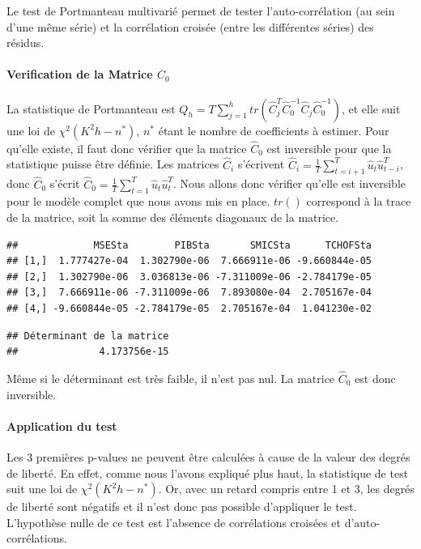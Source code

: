 \documentclass[11pt,]{article}
\let\oldparagraph\paragraph
\renewcommand{\paragraph}[1]{\oldparagraph{#1}\mbox{}}
\begin{document}
Le test de Portmanteau multivarié permet de tester l'auto-corrélation
(au sein d'une même série) et la corrélation croisée (entre les
différentes séries) des résidus.

\paragraph{\texorpdfstring{Verification de la Matrice
\(C_0\)}{Verification de la Matrice C\_0}}\label{verification-de-la-matrice-c_0}

La statistique de Portmanteau est
\(Q_h = T \sum_{j=1}^h tr(\hat{C}_j^T \hat{C}_0^{-1} \hat{C}_j \hat{C}_0^{-1})\),
et elle suit une loi de \(\chi^2(K^2h - n^*)\), \(n^*\) étant le nombre
de coefficients à estimer. Pour qu'elle existe, il faut donc vérifier
que la matrice \(\hat{C}_0\) est inversible pour que la statistique
puisse être définie. Les matrices \(\hat{C}_i\) s'écrivent
\(\hat{C}_i = \frac{1}{T} \sum_{t=i+1}^T \hat{u}_t \hat{u}_{t-i}^T\),
donc \(\hat{C}_0\) s'écrit
\(\hat{C}_0 = \frac{1}{T} \sum_{t=1}^T \hat{u}_t \hat{u}_t^T\). Nous
allons donc vérifier qu'elle est inversible pour le modèle complet que
nous avons mis en place. \(tr()\) correspond à la trace de la matrice,
soit la somme des éléments diagonaux de la matrice.

\begin{verbatim}
##             MSESta        PIBSta       SMICSta      TCHOFSta
## [1,]  1.777427e-04  1.302790e-06  7.666911e-06 -9.660844e-05
## [2,]  1.302790e-06  3.036813e-06 -7.311009e-06 -2.784179e-05
## [3,]  7.666911e-06 -7.311009e-06  7.893080e-04  2.705167e-04
## [4,] -9.660844e-05 -2.784179e-05  2.705167e-04  1.041230e-02
\end{verbatim}

\begin{verbatim}
## Déterminant de la matrice 
##              4.173756e-15
\end{verbatim}

Même si le déterminant est très faible, il n'est pas nul. La matrice
\(\hat{C}_0\) est donc inversible.

\paragraph{Application du test}\label{application-du-test}

Les 3 premières p-values ne peuvent être calculées à cause de la valeur
des degrés de liberté. En effet, comme nous l'avons expliqué plus haut,
la statistique de test suit une loi de \(\chi^2(K^2h - n^*)\). Or, avec
un retard compris entre 1 et 3, les degrés de liberté sont négatifs et
il n'est donc pas possible d'appliquer le test. L'hypothèse nulle de ce
test est l'absence de corrélations croisées et d'auto-corrélations.
\end{document}

